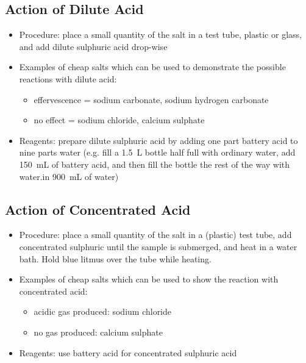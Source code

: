 \subsection{Action of Dilute Acid} 
\begin{itemize}
\item{Procedure: place a small quantity of the salt in a test tube, 
plastic or glass, 
and add dilute sulphuric acid drop-wise}
\item{Examples of cheap salts which can be used to demonstrate the possible reactions with dilute acid:}
\begin{itemize}
\item{effervescence = sodium carbonate, 
sodium hydrogen carbonate}
\item{no effect = sodium chloride, 
calcium sulphate}
\end{itemize}
\item{Reagents: prepare dilute sulphuric acid 
by adding one part battery acid to nine parts water (e.g. 
fill a 1.5~L bottle half full with ordinary water, 
add 150~mL of battery acid, 
and then fill the bottle the rest of the way 
with water.in 900~mL of water)}
\end{itemize}

\subsection{Action of Concentrated Acid}
\begin{itemize}
\item{Procedure: place a small quantity of the salt in a (plastic) test tube, 
add concentrated sulphuric until the sample is submerged, 
and heat in a water bath. 
Hold blue litmus over the tube while heating.}
\item{Examples of cheap salts which can be used to show the reaction with concentrated acid:}
\begin{itemize}
\item{acidic gas produced: sodium chloride}
\item{no gas produced: calcium sulphate}
\end{itemize}
\item{Reagents: use battery acid for concentrated sulphuric acid}
\end{itemize}

